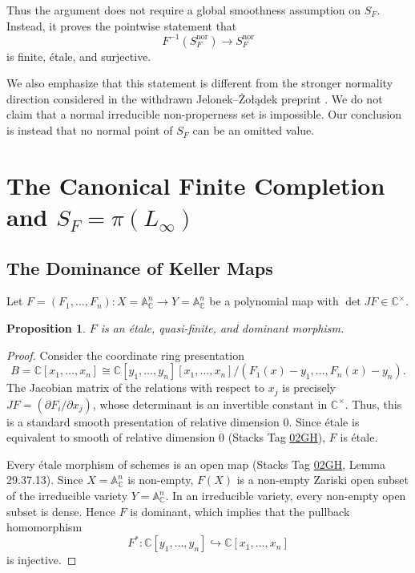 \documentclass[11pt,reqno]{amsart}
\theoremstyle{plain}
\newtheorem{proposition}[theorem]{Proposition}
\theoremstyle{definition}
\numberwithin{equation}{section}
\newcommand{\A}{\mathbb{A}}
\newcommand{\C}{\mathbb{C}}
\begin{document}
Thus the argument does not require a global smoothness assumption on $S_F$. Instead, it proves the pointwise statement that
\[
F^{-1}(S_F^{\mathrm{nor}}) \longrightarrow S_F^{\mathrm{nor}}
\]
is finite, \'{e}tale, and surjective.

We also emphasize that this statement is different from the stronger normality direction considered in the withdrawn Jelonek--\.{Z}o{\l}\k{a}dek preprint \cite{JelonekZoladek2020}.  We do not claim that a normal irreducible non-properness set is impossible.  Our conclusion is instead that no normal point of $S_F$ can be an omitted value.

\section{The Canonical Finite Completion and \texorpdfstring{$S_F = \pi(L_\infty)$}{SF = pi(L)}}

\subsection{The Dominance of Keller Maps}
Let $F = (F_1, \dots, F_n): X = \A^n_\C \to Y = \A^n_\C$ be a polynomial map with $\det JF \in \C^\times$.

\begin{proposition}\label{prop:keller-etale}
$F$ is an \'{e}tale, quasi-finite, and dominant morphism.
\end{proposition}
\begin{proof}
Consider the coordinate ring presentation
\[
B = \C[x_1, \dots, x_n] \cong \C[y_1, \dots, y_n][x_1, \dots, x_n] / (F_1(x)-y_1, \dots, F_n(x)-y_n).
\]
The Jacobian matrix of the relations with respect to $x_j$ is precisely $JF = (\partial F_i / \partial x_j)$, whose determinant is an invertible constant in $\C^\times$. Thus, this is a standard smooth presentation of relative dimension 0. Since \'{e}tale is equivalent to smooth of relative dimension 0 (Stacks Tag \href{https://stacks.math.columbia.edu/tag/02GH}{02GH}), $F$ is \'{e}tale.

Every \'{e}tale morphism of schemes is an open map (Stacks Tag \href{https://stacks.math.columbia.edu/tag/02GH}{02GH}, Lemma 29.37.13). Since $X = \A^n_\C$ is non-empty, $F(X)$ is a non-empty Zariski open subset of the irreducible variety $Y = \A^n_\C$. In an irreducible variety, every non-empty open subset is dense. Hence $F$ is dominant, which implies that the pullback homomorphism
\[
F^*: \C[y_1, \dots, y_n] \hookrightarrow \C[x_1, \dots, x_n]
\]
is injective.
\end{proof}
\end{document}
